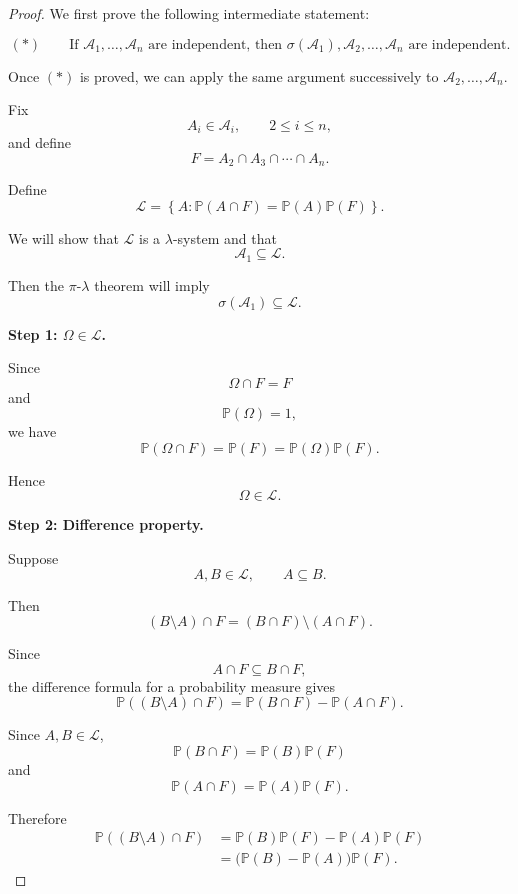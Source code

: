 \begin{proof}

We first prove the following intermediate statement:

\[
(\ast)\qquad
\text{If }
\mathcal{A}_1,\ldots,\mathcal{A}_n
\text{ are independent, then }
\sigma(\mathcal{A}_1),\mathcal{A}_2,\ldots,\mathcal{A}_n
\text{ are independent.}
\]

Once $(\ast)$ is proved, we can apply the same argument successively
to $\mathcal{A}_2,\ldots,\mathcal{A}_n$.

\medskip

Fix
\[
A_i\in\mathcal{A}_i,
\qquad 2\leq i\leq n,
\]
and define
\[
F=A_2\cap A_3\cap\cdots\cap A_n.
\]

Define
\[
\mathcal{L}
=
\left\{
A:
\mathbb{P}(A\cap F)
=
\mathbb{P}(A)\mathbb{P}(F)
\right\}.
\]

We will show that $\mathcal{L}$ is a $\lambda$-system and that
\[
\mathcal{A}_1\subseteq\mathcal{L}.
\]

Then the $\pi$-$\lambda$ theorem will imply
\[
\sigma(\mathcal{A}_1)\subseteq\mathcal{L}.
\]

\medskip

\textbf{Step 1: $\Omega\in\mathcal{L}$.}

Since
\[
\Omega\cap F=F
\]
and
\[
\mathbb{P}(\Omega)=1,
\]
we have
\[
\mathbb{P}(\Omega\cap F)
=
\mathbb{P}(F)
=
\mathbb{P}(\Omega)\mathbb{P}(F).
\]

Hence
\[
\Omega\in\mathcal{L}.
\]

\medskip

\textbf{Step 2: Difference property.}

Suppose
\[
A,B\in\mathcal{L},
\qquad A\subseteq B.
\]

Then
\[
(B\setminus A)\cap F
=
(B\cap F)\setminus(A\cap F).
\]

Since
\[
A\cap F\subseteq B\cap F,
\]
the difference formula for a probability measure gives
\[
\mathbb{P}((B\setminus A)\cap F)
=
\mathbb{P}(B\cap F)
-
\mathbb{P}(A\cap F).
\]

Since $A,B\in\mathcal{L}$,
\[
\mathbb{P}(B\cap F)
=
\mathbb{P}(B)\mathbb{P}(F)
\]
and
\[
\mathbb{P}(A\cap F)
=
\mathbb{P}(A)\mathbb{P}(F).
\]

Therefore
\[
\begin{aligned}
\mathbb{P}((B\setminus A)\cap F)
&=
\mathbb{P}(B)\mathbb{P}(F)
-
\mathbb{P}(A)\mathbb{P}(F)\\
&=
\bigl(\mathbb{P}(B)-\mathbb{P}(A)\bigr)\mathbb{P}(F).
\end{aligned}
\]


\end{proof}
